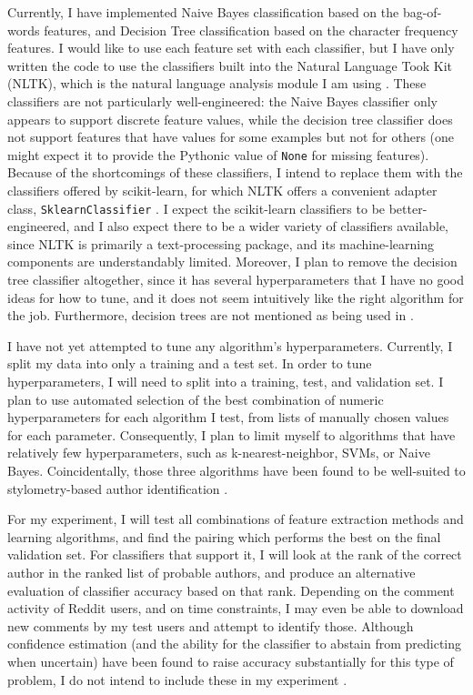 \documentclass{article}
\begin{document}
Currently, I have implemented Naive Bayes classification based on the bag-of-words features, and Decision Tree classification based on the character frequency features. I would like to use each feature set with each classifier, but I have only written the code to use the classifiers built into the Natural Language Took Kit (NLTK), which is the natural language analysis module I am using \cite{nltk2012classify, perk2010text}. These classifiers are not particularly well-engineered: the Naive Bayes classifier only appears to support discrete feature values, while the decision tree classifier does not support features that have values for some examples but not for others (one might expect it to provide the Pythonic value of \texttt{None} for missing features). Because of the shortcomings of these classifiers, I intend to replace them with the classifiers offered by scikit-learn, for which NLTK offers a convenient adapter class, \texttt{SklearnClassifier} \cite{nltk2012classify}. I expect the scikit-learn classifiers to be better-engineered, and I also expect there to be a wider variety of classifiers available, since NLTK is primarily a text-processing package, and its machine-learning components are understandably limited. Moreover, I plan to remove the decision tree classifier altogether, since it has several hyperparameters that I have no good ideas for how to tune, and it does not seem intuitively like the right algorithm for the job. Furthermore, decision trees are not mentioned as being used in \cite{narayanan2012feasibility}.

I have not yet attempted to tune any algorithm's hyperparameters. Currently, I split my data into only a training and a test set. In order to tune hyperparameters, I will need to split into a training, test, and validation set. I plan to use automated selection of the best combination of numeric hyperparameters for each algorithm I test, from lists of manually chosen values for each parameter. Consequently, I plan to limit myself to algorithms that have relatively few hyperparameters, such as k-nearest-neighbor, SVMs, or Naive Bayes. Coincidentally, those three algorithms have been found to be well-suited to stylometry-based author identification \cite{narayanan2012feasibility}.

For my experiment, I will test all combinations of feature extraction methods and learning algorithms, and find the pairing which performs the best on the final validation set. For classifiers that support it, I will look at the rank of the correct author in the ranked list of probable authors, and produce an alternative evaluation of classifier accuracy based on that rank. Depending on the comment activity of Reddit users, and on time constraints, I may even be able to download new comments by my test users and attempt to identify those. Although confidence estimation (and the ability for the classifier to abstain from predicting when uncertain) have been found to raise accuracy substantially for this type of problem, I do not intend to include these in my experiment \cite{narayanan2012feasibility}.
\end{document}
